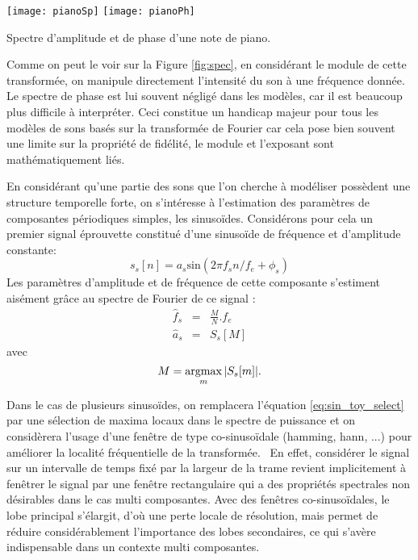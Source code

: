 \begin{marginfigure}
  \texttt{[image: pianoSp]}
  \texttt{[image: pianoPh]}
  \caption{Spectre d'amplitude et de phase d'une note de piano.}
  \label{fig:spec}
\end{marginfigure}

Comme on peut le voir sur la Figure \ref{fig:spec}, en considérant le module de cette transformée, on manipule directement l'intensité du son à une fréquence donnée. Le spectre de phase est lui souvent négligé dans les modèles, car il est beaucoup plus difficile à interpréter. Ceci constitue un handicap majeur pour tous les modèles de sons basés sur la transformée de Fourier car cela pose bien souvent une limite sur la propriété de fidélité, le module et l'exposant sont mathématiquement liés.


En considérant qu'une partie des sons que l'on cherche à modéliser possèdent une structure temporelle forte, on s'intéresse à l'estimation des paramètres de composantes périodiques simples, les sinusoïdes. Considérons pour cela un premier signal \og éprouvette \fg constitué d'une sinusoïde de fréquence et d'amplitude constante:
\begin{equation}
  s_s[n] = a_s \mathrm{sin}(2\pi f_s n /f_e + \phi_s)
  \label{eq:sin_toy}
\end{equation}
Les paramètres d'amplitude et de fréquence de cette composante s'estiment aisément grâce au spectre de Fourier de ce signal :
\begin{eqnarray}
  \hat{f}_s &=&  \frac{M}{N} . f_e\\
  \hat{a}_s &=& S_s[M]
    \label{eq:sin_toy_est}
\end{eqnarray}
avec
\begin{equation}
  M = \operatorname*{argmax}_m | S_s[m] |.
  \label{eq:sin_toy_select}
\end{equation}

Dans le cas de plusieurs sinusoïdes, on remplacera l'équation \ref{eq:sin_toy_select} par une sélection de maxima locaux dans le spectre de puissance et on considèrera l'usage d'une fenêtre de type co-sinusoïdale (hamming, hann, ...) pour améliorer la localité fréquentielle de la transformée.~\cite{harris1978use} En effet, considérer le signal sur un intervalle de temps fixé par la largeur de la trame revient implicitement à fenêtrer le signal par une fenêtre rectangulaire qui a des propriétés spectrales non désirables dans le cas multi composantes. Avec des fenêtres co-sinusoïdales, le lobe principal s'élargit, d'où une perte locale de résolution, mais permet de réduire considérablement l'importance des lobes secondaires, ce qui s'avère indispensable dans un contexte multi composantes.

